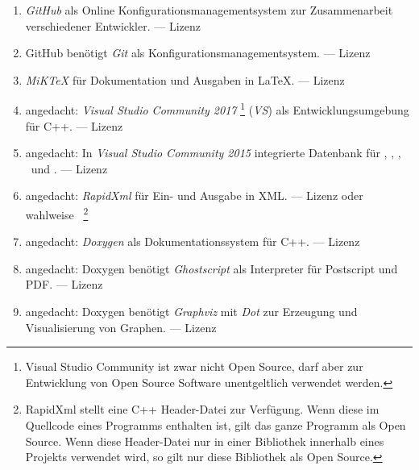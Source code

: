 \begin{enumerate}
	\setcounter{enumi}{\value{Enumi}}%

	\item\label{Werkzeug:GitHub}\emph{GitHub} als Online Konfigurationsmanagementsystem zur Zusammenarbeit verschiedener Entwickler.
	--- Lizenz 

	\item\label{Werkzeug:Git}GitHub benötigt \emph{Git} als Konfigurationsmanagementsystem.
	--- Lizenz 

	\item\label{Werkzeug:MiKTeX}\emph{MiK\TeX} für Dokumentation und Ausgaben in \LaTeX.
	--- Lizenz 

	\item\label{Werkzeug:VSC}angedacht: \emph{Visual Studio Community 2017}%
	\footnote{%
		Visual Studio Community ist zwar nicht Open Source, darf aber zur Entwicklung von Open Source Software
		unentgeltlich verwendet werden.
	}
	(\emph{VS}) als Entwicklungsumgebung für C++.
	--- Lizenz 

	\item\label{Werkzeug:VSC DB}angedacht: In \emph{Visual Studio Community 2015} integrierte Datenbank für \Ausgabeschemata, \Saetze, \Beweise, \Fachbegriffe\ und \Teilgebiete.
	--- Lizenz 

	\item\label{Werkzeug:RapidXml}angedacht: \emph{RapidXml} für Ein- und Ausgabe in XML.
	--- Lizenz  oder wahlweise~\cite{bib:MIT}
	\footnote{%
		RapidXml stellt eine C++ Header-Datei zur Verfügung.
		Wenn diese im Quellcode eines Programms enthalten ist, gilt das ganze Programm als Open Source.
		Wenn diese Header-Datei nur in einer Bibliothek innerhalb eines Projekts verwendet wird, so gilt nur diese Bibliothek als Open Source.
	}

	\item\label{Werkzeug:Doxygen}angedacht: \emph{Doxygen} als Dokumentationssystem für C++.
	--- Lizenz 

	\item\label{Werkzeug:Ghostscript}angedacht: Doxygen benötigt \emph{Ghostscript} als Interpreter für Postscript und PDF.
	--- Lizenz 

	\item\label{Werkzeug:Graphviz}angedacht: Doxygen benötigt \emph{Graphviz} mit \emph{Dot} zur Erzeugung und Visualisierung von Graphen.
	--- Lizenz 

	\setcounter{Enumi}{\value{enumi}}%
\end{enumerate}

